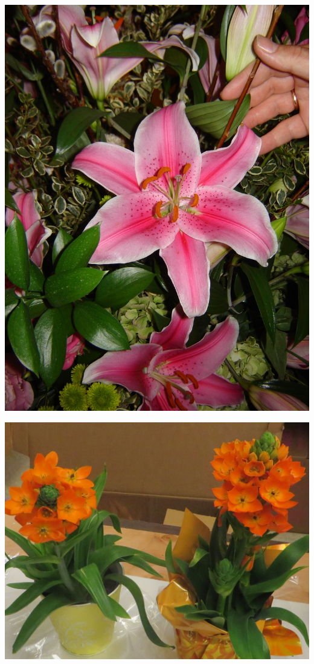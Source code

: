 \documentclass{article}
\begin{document}
\begin{center}
\includegraphics[width=0.9\textheight, angle=90]{../Stargazer_(OrientalLily).jpg}
\end{center}
\newpage

\begin{center}
\includegraphics[width=0.9\textheight, angle=90]{../StarOfBethlehem.jpg}
\end{center}
\newpage
\end{document}

